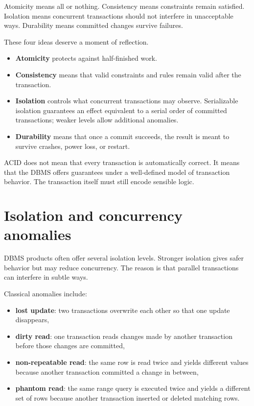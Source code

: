 \documentclass[11pt,a4paper,openany]{book}
\begin{document}
Atomicity means all or nothing. Consistency means constraints remain satisfied. Isolation means concurrent transactions should not interfere in unacceptable ways. Durability means committed changes survive failures.

These four ideas deserve a moment of reflection.
\begin{itemize}
\item \textbf{Atomicity} protects against half-finished work.
\item \textbf{Consistency} means that valid constraints and rules remain valid after the transaction.
\item \textbf{Isolation} controls what concurrent transactions may observe. Serializable isolation guarantees an effect equivalent to a serial order of committed transactions; weaker levels allow additional anomalies.
\item \textbf{Durability} means that once a commit succeeds, the result is meant to survive crashes, power loss, or restart.
\end{itemize}

ACID does not mean that every transaction is automatically correct. It means that the DBMS offers guarantees under a well-defined model of transaction behavior. The transaction itself must still encode sensible logic.

\section{Isolation and concurrency anomalies}
DBMS products often offer several isolation levels. Stronger isolation gives safer behavior but may reduce concurrency. The reason is that parallel transactions can interfere in subtle ways.

Classical anomalies include:
\begin{itemize}
\item \textbf{lost update}: two transactions overwrite each other so that one update disappears,
\item \textbf{dirty read}: one transaction reads changes made by another transaction before those changes are committed,
\item \textbf{non-repeatable read}: the same row is read twice and yields different values because another transaction committed a change in between,
\item \textbf{phantom read}: the same range query is executed twice and yields a different set of rows because another transaction inserted or deleted matching rows.
\end{itemize}
\end{document}
